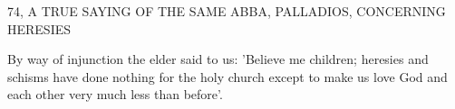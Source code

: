 74, A TRUE SAYING OF THE SAME ABBA,
PALLADIOS, CONCERNING HERESIES

By way of injunction the elder said to us: 'Believe me children;
heresies and schisms have done nothing for the holy church except
to make us love God and each other very much less than before'.

